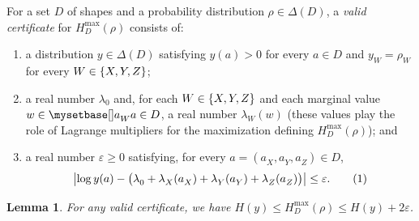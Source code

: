 \documentclass[11pt, a4paper, copyright, gdm]{google}
\theoremstyle{definition}
\theoremstyle{remark}
\theoremstyle{plain}
\newtheorem{lemma}{Lemma}
\newcommand{\defn}[1]{{\emph{{#1}}}}
\DeclarePairedDelimiter{\bk}{(}{)}
\DeclarePairedDelimiter{\BK}{\{}{\}}
\newcommand{\numberthis}{\addtocounter{equation}{1}\tag{\theequation}}
\newcommand{\eps}{\varepsilon}
\DeclarePairedDelimiter{\absolute}{\lvert}{\rvert}
\begin{document}
For a set $D$ of shapes and a probability distribution $\rho \in \Delta(D)$, a \defn{valid certificate} for $H_D^{\max}(\rho)$ consists of:
\begin{enumerate}
  \item a distribution $y \in \Delta(D)$ satisfying $y(a) > 0$ for every $a \in D$ and $y_W^{} = \rho_W^{}$ for every $W \in \BK{X, Y, Z}$;
  \item a real number $\lambda_0^{}$ and, for each $W \in \BK{X, Y, Z}$ and each marginal value $w \in \myset{a_W^{}}{a \in D}$, a real number $\lambda_W^{}(w)$ (these values play the role of Lagrange multipliers for the maximization defining $H_D^{\max}(\rho)$); and
  \item a real number $\eps \ge 0$ satisfying,
  for every $a = (a_X^{}, a_Y^{}, a_Z^{}) \in D$,
        \[
          \absolute [\big]{\log y(a) - \bk[\big]{\lambda_0^{} + \lambda_X^{}(a_X^{}) + \lambda_Y^{}(a_Y^{}) + \lambda_Z^{}(a_Z^{})}}
          \le \eps. \numberthis \label{eq:certificate-residual}
        \]
\end{enumerate}

\begin{lemma}
  \label{lem:max-entropy-upper-bound}
  For any valid certificate, we have $H(y) \le H_D^{\max}(\rho) \le H(y) + 2 \eps$.
\end{lemma}
\end{document}
